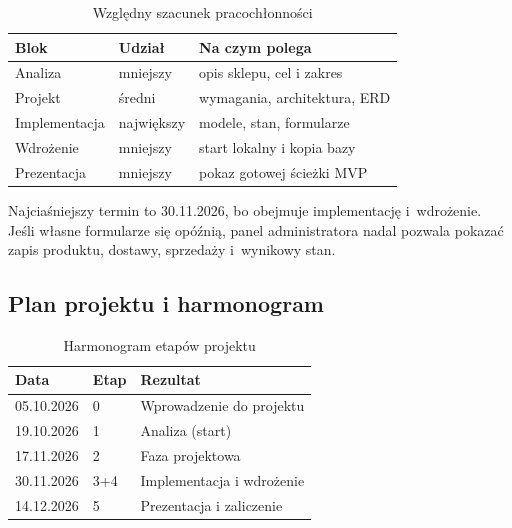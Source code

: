 \begin{table}[H]
	\centering
	\caption{Względny szacunek pracochłonności}
	\label{tab:pracochlonnosc}
	\begin{tabular}{@{}L{0.24\textwidth}L{0.22\textwidth}L{0.44\textwidth}@{}}
		\toprule
		Blok & Udział & Na czym polega \\
		\midrule
		Analiza & mniejszy & opis sklepu, cel i zakres \\
		Projekt & średni & wymagania, architektura, ERD \\
		Implementacja & największy & modele, stan, formularze \\
		Wdrożenie & mniejszy & start lokalny i kopia bazy \\
		Prezentacja & mniejszy & pokaz gotowej ścieżki MVP \\
		\bottomrule
	\end{tabular}
\end{table}

Najciaśniejszy termin to 30.11.2026, bo obejmuje implementację i~wdrożenie. Jeśli własne formularze się opóźnią, panel administratora nadal pozwala pokazać zapis produktu, dostawy, sprzedaży i~wynikowy stan.

\subsection{Plan projektu i harmonogram}

\begin{table}[H]
	\centering
	\caption{Harmonogram etapów projektu}
	\label{tab:harmonogram}
	\begin{tabular}{@{}lll@{}}
		\toprule
		Data & Etap & Rezultat \\
		\midrule
		05.10.2026 & 0 & Wprowadzenie do projektu \\
		19.10.2026 & 1 & Analiza (start) \\
		17.11.2026 & 2 & Faza projektowa \\
		30.11.2026 & 3+4 & Implementacja i wdrożenie \\
		14.12.2026 & 5 & Prezentacja i zaliczenie \\
		\bottomrule
	\end{tabular}
\end{table}
